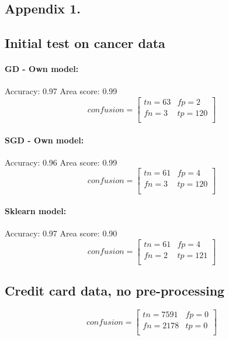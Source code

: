 \documentclass[%
oneside,                 %
final,                   %
10pt]{article}
\begin{document}
\begin{appendices}
\section*{Appendix 1.} \label{APP_1}

\subsection*{Initial test on cancer data}
\paragraph{GD - Own model:}
Accuracy: 0.97 Area score: 0.99 
\begin{equation}
confusion=\begin{bmatrix}
tn=63 & fp=2 \\
fn=3  &tp= 120 \\
\end{bmatrix}
\end{equation}

\paragraph{SGD - Own model:}
Accuracy: 0.96 Area score: 0.99 
\begin{equation}
confusion=\begin{bmatrix}
tn=61 & fp=4 \\
fn=3  &tp= 120 \\
\end{bmatrix}
\end{equation}

\paragraph{Sklearn model:}
Accuracy: 0.97 Area score: 0.90 
\begin{equation}
confusion=\begin{bmatrix}
tn=61 & fp=4 \\
fn=2  &tp= 121 \\
\end{bmatrix}
\end{equation}


\subsection*{Credit card data, no pre-processing}
\begin{equation}
confusion=\begin{bmatrix}
tn=7591 & fp=0 \\
fn=2178  &tp= 0 \\
\end{bmatrix}
\end{equation}


\end{appendices}
\end{document}
